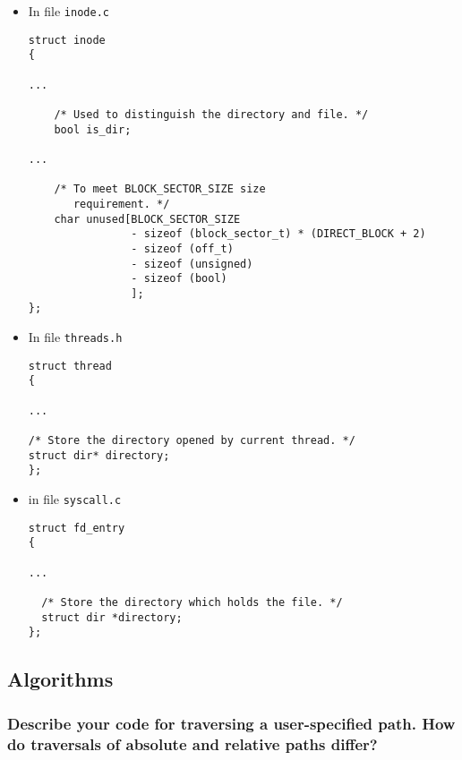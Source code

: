 \documentclass[sigconf, nonacm, balance=false, urlbreakonhyphens=true]{acmart}
\begin{document}
                \begin{itemize}
                    \item In file \texttt{inode.c}
\begin{verbatim}
struct inode
{

...

    /* Used to distinguish the directory and file. */
    bool is_dir;
    
...

    /* To meet BLOCK_SECTOR_SIZE size 
       requirement. */
    char unused[BLOCK_SECTOR_SIZE
                - sizeof (block_sector_t) * (DIRECT_BLOCK + 2)  
                - sizeof (off_t)              
                - sizeof (unsigned)           
                - sizeof (bool)              
                ];
};
\end{verbatim}
                \end{itemize}

 \begin{itemize}
                    \item In file \texttt{threads.h}
\begin{verbatim}
struct thread
{

...

/* Store the directory opened by current thread. */
struct dir* directory;
};

\end{verbatim}
                    \end{itemize}
\begin{itemize}
    \item in file \texttt{syscall.c}
\begin{verbatim}
struct fd_entry
{

...

  /* Store the directory which holds the file. */
  struct dir *directory;
};
\end{verbatim}
\end{itemize}
        \subsection{Algorithms}

            \subsubsection{Describe your code for traversing a user-specified path.  How do traversals of absolute and relative paths differ? } 
            
\end{document}
